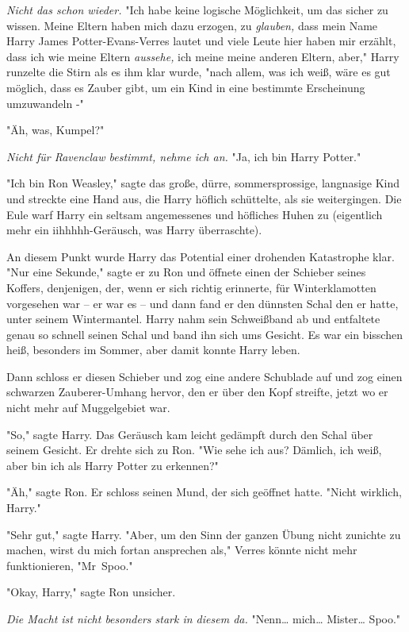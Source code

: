 {\emph{Nicht das schon wieder.} "Ich habe keine logische Möglichkeit, um das sicher zu wissen. Meine Eltern haben mich dazu erzogen, zu \emph{glauben,} dass mein Name Harry James Potter-Evans-Verres lautet und viele Leute hier haben mir erzählt, dass ich wie meine Eltern \emph{aussehe,} ich meine meine anderen Eltern, aber," Harry runzelte die Stirn als es ihm klar wurde, "nach allem, was ich weiß, wäre es gut möglich, dass es Zauber gibt, um ein Kind in eine bestimmte Erscheinung umzuwandeln -"

"Äh, was, Kumpel?"

\emph{Nicht für Ravenclaw bestimmt, nehme ich an.} "Ja, ich bin Harry Potter."

"Ich bin Ron Weasley," sagte das große, dürre, sommersprossige, langnasige Kind und streckte eine Hand aus, die Harry höflich schüttelte, als sie weitergingen. Die Eule warf Harry ein seltsam angemessenes und höfliches Huhen zu (eigentlich mehr ein iihhhhh-Geräusch, was Harry überraschte).

An diesem Punkt wurde Harry das Potential einer drohenden Katastrophe klar. "Nur eine Sekunde," sagte er zu Ron und öffnete einen der Schieber seines Koffers, denjenigen, der, wenn er sich richtig erinnerte, für Winterklamotten vorgesehen war -- er war es -- und dann fand er den dünnsten Schal den er hatte, unter seinem Wintermantel. Harry nahm sein Schweißband ab und entfaltete genau so schnell seinen Schal und band ihn sich ums Gesicht. Es war ein bisschen heiß, besonders im Sommer, aber damit konnte Harry leben.

Dann schloss er diesen Schieber und zog eine andere Schublade auf und zog einen schwarzen Zauberer-Umhang hervor, den er über den Kopf streifte, jetzt wo er nicht mehr auf Muggelgebiet war.

"So," sagte Harry. Das Geräusch kam leicht gedämpft durch den Schal über seinem Gesicht. Er drehte sich zu Ron. "Wie sehe ich aus? Dämlich, ich weiß, aber bin ich als Harry Potter zu erkennen?"

"Äh," sagte Ron. Er schloss seinen Mund, der sich geöffnet hatte. "Nicht wirklich, Harry."

"Sehr gut," sagte Harry. "Aber, um den Sinn der ganzen Übung nicht zunichte zu machen, wirst du mich fortan ansprechen als," Verres könnte nicht mehr funktionieren, "Mr~Spoo."

"Okay, Harry," sagte Ron unsicher.

\emph{Die Macht ist nicht besonders stark in diesem da.} "Nenn… mich… Mister… Spoo."

}
